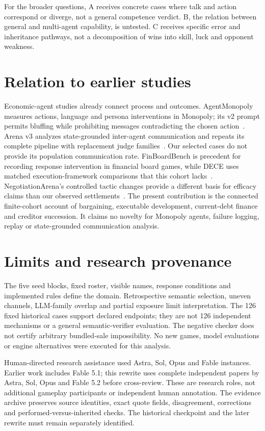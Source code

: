 For the broader questions, A receives concrete cases where talk and action correspond or diverge, not a general competence verdict. B, the relation between general and multi-agent capability, is untested. C receives specific error and inheritance pathways, not a decomposition of wins into skill, luck and opponent weakness.

\section{Relation to earlier studies}

Economic-agent studies already connect process and outcomes. AgentMonopoly measures actions, language and persona interventions in Monopoly; its v2 prompt permits bluffing while prohibiting messages contradicting the chosen action~\citep{wu2026agentmonopoly}. Arena v3 analyzes state-grounded inter-agent communication and repeats its complete pipeline with replacement judge families~\citep{li2026arena}. Our selected cases do not provide its population communication rate. FinBoardBench is precedent for recording response intervention in financial board games, while DECE uses matched execution-framework comparisons that this cohort lacks~\citep{hu2026finboardbench,zhang2026dece}. NegotiationArena's controlled tactic changes provide a different basis for efficacy claims than our observed settlements~\citep{bianchi2024negotiationarena}. The present contribution is the connected finite-cohort account of bargaining, executable development, current-debt finance and creditor succession. It claims no novelty for Monopoly agents, failure logging, replay or state-grounded communication analysis.

\section{Limits and research provenance}

The five seed blocks, fixed roster, visible names, response conditions and implemented rules define the domain. Retrospective semantic selection, uneven channels, LLM-family overlap and partial exposure limit interpretation. The 126 fixed historical cases support declared endpoints; they are not 126 independent mechanisms or a general semantic-verifier evaluation. The negative checker does not certify arbitrary bundled-sale impossibility. No new games, model evaluations or engine alternatives were executed for this analysis.

Human-directed research assistance used Astra, Sol, Opus and Fable instances. Earlier work includes Fable 5.1; this rewrite uses complete independent papers by Astra, Sol, Opus and Fable 5.2 before cross-review. These are research roles, not additional gameplay participants or independent human annotation. The evidence archive preserves source identities, exact quote fields, disagreement, corrections and performed-versus-inherited checks. The historical checkpoint and the later rewrite must remain separately identified.

